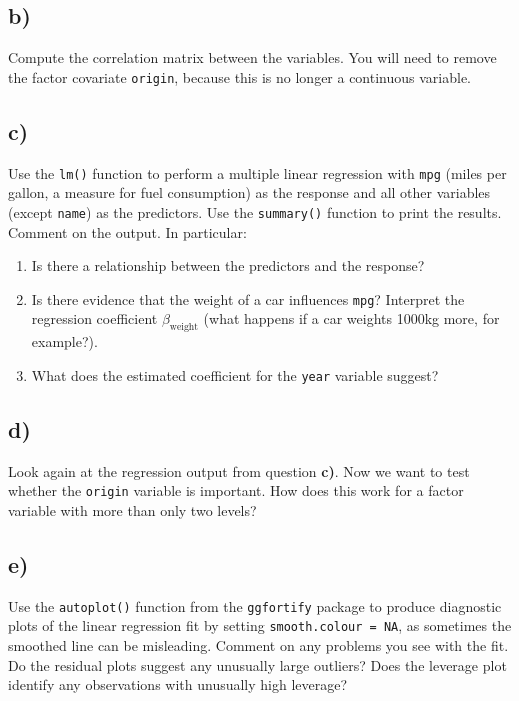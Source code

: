 \documentclass[
]{article}
\begin{document}
\hypertarget{b}{%
\subsection{b)}\label{b}}

Compute the correlation matrix between the variables. You will need to
remove the factor covariate \texttt{origin}, because this is no longer a
continuous variable.

\hypertarget{c}{%
\subsection{c)}\label{c}}

Use the \texttt{lm()} function to perform a multiple linear regression
with \texttt{mpg} (miles per gallon, a measure for fuel consumption) as
the response and all other variables (except \texttt{name}) as the
predictors. Use the \texttt{summary()} function to print the results.
Comment on the output. In particular:

\begin{enumerate}
\def\labelenumi{\roman{enumi}.}
\item
  Is there a relationship between the predictors and the response?
\item
  Is there evidence that the weight of a car influences \texttt{mpg}?
  Interpret the regression coefficient \(\beta_{\text{weight}}\) (what
  happens if a car weights 1000kg more, for example?).
\item
  What does the estimated coefficient for the \texttt{year} variable
  suggest?
\end{enumerate}

\hypertarget{d}{%
\subsection{d)}\label{d}}

Look again at the regression output from question \textbf{c)}. Now we
want to test whether the \texttt{origin} variable is important. How does
this work for a factor variable with more than only two levels?

\hypertarget{e}{%
\subsection{e)}\label{e}}

Use the \texttt{autoplot()} function from the \texttt{ggfortify} package
to produce diagnostic plots of the linear regression fit by setting
\texttt{smooth.colour\ =\ NA}, as sometimes the smoothed line can be
misleading. Comment on any problems you see with the fit. Do the
residual plots suggest any unusually large outliers? Does the leverage
plot identify any observations with unusually high leverage?
\end{document}
